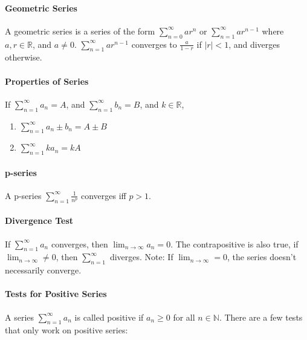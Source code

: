 \documentclass[10pt,letter]{article}
\begin{document}
\paragraph{Geometric Series} A geometric series is a series of the form $\sum_{n=0}^\infty ar^n$ or $\sum_{n=1}^\infty ar^{n-1}$ where $a,r\in\mathbb{R}$, and $a\neq0$. $\sum_{n=1}^\infty ar^{n-1}$ converges to $\frac{a}{1-r}$ if $|r|<1$, and diverges otherwise. 

\paragraph{Properties of Series} If $\sum_{n=1}^\infty a_n=A$, and $\sum_{n=1}^\infty b_n=B$, and $k\in\mathbb{R}$, \begin{enumerate}
    \item $\sum_{n=1}^\infty a_n\pm b_n=A\pm B$ 
    \item $\sum_{n=1}^\infty ka_n=kA$
\end{enumerate}

\paragraph{p-series} A p-series $\sum_{n=1}^\infty\frac{1}{n^p}$ converges iff $p>1$. 

\paragraph{Divergence Test} If $\sum_{n=1}^\infty a_n$ converges, then $\lim_{n\rightarrow\infty}a_n=0$. The contrapositive is also true, if $\lim_{n\rightarrow\infty}\neq 0$, then $\sum_{n=1}^\infty$ diverges. Note: If $\lim_{n\rightarrow\infty}=0$, the series doesn't necessarily converge. 

\paragraph{Tests for Positive Series} A series $\sum_{n=1}^\infty a_n$ is called positive if $a_n\geq0$ for all $n\in\mathbb{N}$. There are a few tests that only work on positive series:
\end{document}

